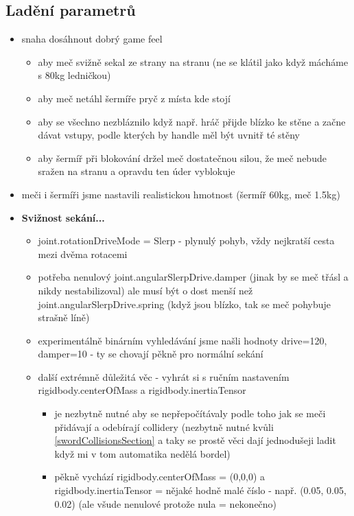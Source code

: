 \subsection{Ladění parametrů} \label{swordParameterTweaksSection}
\begin{itemize}
  \item snaha dosáhnout dobrý game feel
    \begin{itemize}
      \item aby meč svižně sekal ze strany na stranu (ne se klátil jako když mácháme s 80kg ledničkou)
      \item aby meč netáhl šermíře pryč z místa kde stojí
      \item aby se všechno nezbláznilo když např. hráč přijde blízko ke stěne a začne dávat vstupy, podle kterých by handle měl být uvnitř té stěny
      \item aby šermíř při blokování držel meč dostatečnou silou, že meč nebude sražen na stranu a opravdu ten úder vyblokuje 
    \end{itemize}
  \item meči i šermíři jsme nastavili realistickou hmotnost (šermíř 60kg, meč 1.5kg)
  \item \textbf{Svižnost sekání...}
    \begin{itemize}
      \item joint.rotationDriveMode = Slerp - plynulý pohyb, vždy nejkratší cesta mezi dvěma rotacemi
      \item potřeba nenulový joint.angularSlerpDrive.damper (jinak by se meč třásl a nikdy nestabilizoval) ale musí být o dost menší než joint.angularSlerpDrive.spring (když jsou blízko, tak se meč pohybuje strašně líně)
      \item experimentálně binárním vyhledávání jsme našli hodnoty drive=120, damper=10 - ty se chovají pěkně pro normální sekání
      \item další extrémně důležitá věc - vyhrát si s ručním nastavením rigidbody.centerOfMass a rigidbody.inertiaTensor 
        \begin{itemize}
          \item je nezbytně nutné aby se nepřepočítávaly podle toho jak se meči přidávají a odebírají collidery (nezbytně nutné kvůli \ref{swordCollisionsSection} a taky se prostě věci dají jednodušeji ladit když mi v tom automatika nedělá bordel)
          \item pěkně vychází rigidbody.centerOfMass = (0,0,0) a rigidbody.inertiaTensor = nějaké hodně malé číslo - např. (0.05, 0.05, 0.02) (ale všude nenulové protože nula = nekonečno)

\end{itemize}
\end{itemize}
\end{itemize}
